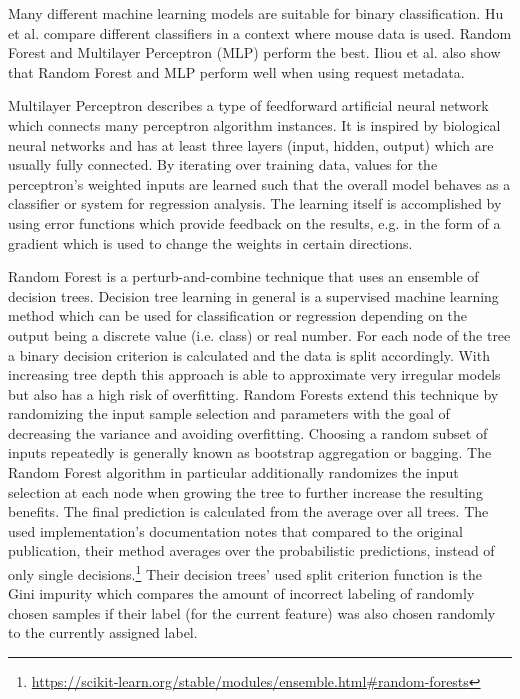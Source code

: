 \documentclass[
    fontsize=12pt,
    headings=small,
    parskip=half,           %
    bibliography=totoc,
    numbers=noenddot,       %
    open=any,               %
    final,                   %
    table
]{scrreprt}
\begin{document}
Many different machine learning models are suitable for binary classification. Hu et al. \cite{8275816} compare different classifiers in a context where mouse data is used. Random Forest and Multilayer Perceptron (MLP) perform the best.
Iliou et al. \cite{10.1145/3339252.3339267} also show that Random Forest and MLP perform well when using request metadata.

Multilayer Perceptron describes a type of feedforward artificial neural network which connects many perceptron algorithm instances. It is inspired by biological neural networks and has at least three layers (input, hidden, output) which are usually fully connected. By iterating over training data, values for the perceptron's weighted inputs are learned such that the overall model behaves as a classifier or system for regression analysis. The learning itself is accomplished by using error functions which provide feedback on the results, e.g. in the form of a gradient which is used to change the weights in certain directions.

Random Forest\cite{Breiman2001} is a perturb-and-combine technique that uses an ensemble of decision trees. Decision tree learning in general is a supervised machine learning method which can be used for classification or regression depending on the output being a discrete value (i.e. class) or real number. For each node of the tree a binary decision criterion is calculated and the data is split accordingly. With increasing tree depth this approach is able to approximate very irregular models but also has a high risk of overfitting. Random Forests extend this technique by randomizing the input sample selection and parameters with the goal of decreasing the variance and avoiding overfitting. Choosing a random subset of inputs repeatedly is generally known as bootstrap  aggregation or bagging. The Random Forest algorithm in particular additionally randomizes the input selection at each node when growing the tree to further increase the resulting benefits. The final prediction is calculated from the average over all trees. The used implementation's documentation notes that compared to the original publication, their method averages over the probabilistic predictions, instead of only single decisions.\footnote{\url{https://scikit-learn.org/stable/modules/ensemble.html\#random-forests}} Their decision trees' used split criterion function is the Gini impurity which compares the amount of incorrect labeling of randomly chosen samples if their label (for the current feature) was also chosen randomly to the currently assigned label.
\end{document}
